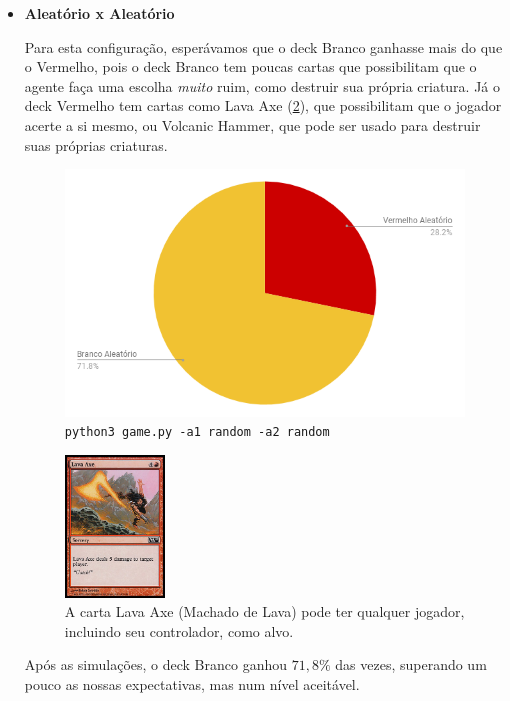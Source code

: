 \begin{itemize}
\item \textbf{Aleatório x Aleatório}

Para esta configuração, esperávamos que o deck Branco ganhasse mais do que o Vermelho, pois o deck Branco tem poucas cartas que possibilitam que o agente faça uma escolha \textit{muito} ruim, como destruir sua própria criatura. Já o deck Vermelho tem cartas como Lava Axe (\ref{lavaaxe}), que possibilitam que o jogador acerte a si mesmo, ou Volcanic Hammer, que pode ser usado para destruir suas próprias criaturas.

\begin{figure}[!h]
  \centering
  \includegraphics[scale=0.4]{picstcc/rara.png}
  \caption{\texttt{python3 game.py -a1 random -a2 random}}
  \label{rara}
\end{figure}

\begin{figure}[!h]
    \centering
    \includegraphics[width=0.25\textwidth]{picstcc/lavaaxedois.png}
    \caption{A carta Lava Axe (Machado de Lava) pode ter qualquer jogador, incluindo seu controlador, como alvo.}
    \label{lavaaxe}
\end{figure}

Após as simulações, o deck Branco ganhou $71,8\%$ das vezes, superando um pouco as nossas expectativas, mas num nível aceitável.


\end{itemize}
